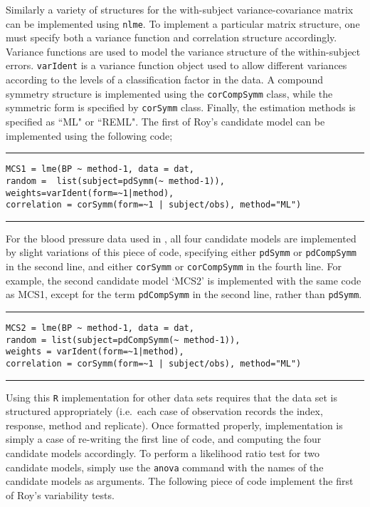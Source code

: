 \documentclass[12pt, a4paper]{report}
\theoremstyle{plain}
\theoremstyle{definition}
\theoremstyle{remark}
\begin{document}
Similarly a variety of structures for the with-subject variance-covariance matrix can be implemented using \texttt{nlme}. To implement a particular matrix structure, one must specify both a variance function and correlation structure accordingly. Variance functions are used to model the variance structure of the within-subject errors. \texttt{varIdent} is a variance function object used to allow different variances according to the levels of a classification factor in the data. A compound symmetry structure is implemented using the \texttt{corCompSymm} class, while the symmetric form is specified by \texttt{corSymm} class. Finally, the estimation methods is specified as ``ML" or ``REML".
\newpage
The first of Roy's candidate model can be implemented using the following code;\\
\hrule
\begin{verbatim}
MCS1 = lme(BP ~ method-1, data = dat,
random =  list(subject=pdSymm(~ method-1)),
weights=varIdent(form=~1|method),
correlation = corSymm(form=~1 | subject/obs), method="ML")
\end{verbatim}
\hrule
\vspace{1cm}
For the blood pressure data used in \citet{roy}, all four candidate models are implemented by slight variations of this piece of code, specifying either \texttt{pdSymm} or \texttt{pdCompSymm} in the second line, and either \texttt{corSymm} or \texttt{corCompSymm} in the fourth line.
For example, the second candidate model `MCS2' is implemented with the same code as MCS1, except for the term \texttt{pdCompSymm} in the second line, rather than \texttt{pdSymm}.
\\
\hrule
\begin{verbatim}
MCS2 = lme(BP ~ method-1, data = dat,
random = list(subject=pdCompSymm(~ method-1)),
weights = varIdent(form=~1|method),
correlation = corSymm(form=~1 | subject/obs), method="ML")
\end{verbatim}
\hrule
\vspace{1cm}
Using this \texttt{R} implementation for other data sets requires that the data set is structured appropriately (i.e.\ each case of observation records the index, response, method and replicate). Once formatted properly, implementation is simply a case of re-writing the first line of code, and computing the four candidate models accordingly.
\newpage
To perform a likelihood ratio test for two candidate models, simply use the \texttt{anova} command with the names of the candidate models as arguments. The following piece of code implement the first of Roy's variability tests.
\end{document}

